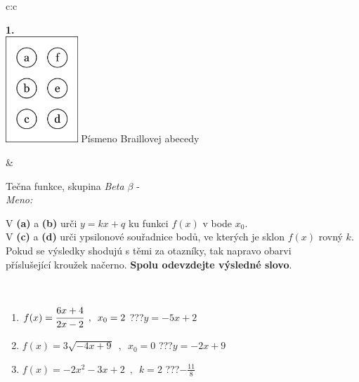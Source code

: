 \documentclass[10pt]{report}
\begin{document}
\begin{tabular}{c:c}
\begin{minipage}[c][104.5mm][t]{0.5\linewidth}
\begin{center}
\begin{minipage}{0.20\linewidth}
\begin{center}
{\Huge\bfseries 1.} \\[2mm]
\includegraphics[height=40mm]{../images/braille.png}
{\small Písmeno Braillovej abecedy}
\end{center}
\end{minipage}
\end{center}
\end{minipage}
&
\begin{minipage}[c][104.5mm][t]{0.5\linewidth}
\begin{center}
\vspace{7mm}
{\huge Tečna funkce, skupina \textit{Beta $\beta$} -}\\[5mm]
\textit{Meno:}\phantom{xxxxxxxxxxxxxxxxxxxxxxxxxxxxxxxxxxxxxxxxxxxxxxxxxxxxxxxxxxxxxxxxx}\\[5mm]
\begin{minipage}{0.95\linewidth}
\begin{center}
V \textbf{(a)} a \textbf{(b)} urči  $y = kx + q$ ku funkci $f(x)$ v bode $x_0$.\\V \textbf{(c)} a \textbf{(d)} urči ypsilonové souřadnice bodů, ve kterých je sklon $f(x)$ rovný $k$.\\Pokud se výsledky shodujú s těmi za otazníky, tak napravo obarvi\\příslušející kroužek načerno. \textbf{Spolu odevzdejte výsledné slovo}.
\end{center}
\end{minipage}
\\[1mm]
\begin{minipage}{0.79\linewidth}
\begin{center}
\begin{varwidth}{\linewidth}
\begin{enumerate}
\small
\item $f(x)=\cfrac{6x+4}{2x-2}\enspace , \enspace x_0=2$\quad \dotfill\; ???\;\dotfill \quad $y = -5x+2$
\item $f(x)=3\sqrt{-4x+9}\enspace , \enspace x_0=0$\quad \dotfill\; ???\;\dotfill \quad $y = -2x+9$
\item $f(x)=-2x^2-3x+2\enspace , \enspace k=2$\quad \dotfill\; ???\;\dotfill \quad $-\frac{11}{8}$

\end{enumerate}
\end{varwidth}
\end{center}
\end{minipage}
\end{center}
\end{minipage}
\end{tabular}
\end{document}
